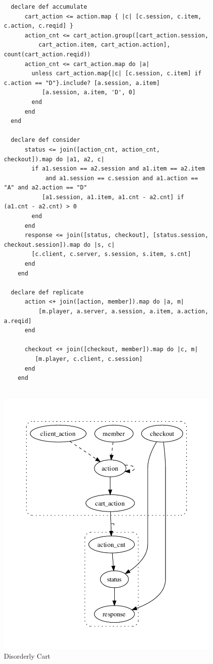 \begin{figure}[t]
\begin{tiny}
\begin{verbatim}
  declare def accumulate 
      cart_action <= action.map { |c| [c.session, c.item, c.action, c.reqid] }
      action_cnt <= cart_action.group([cart_action.session, 
          cart_action.item, cart_action.action], count(cart_action.reqid))
      action_cnt <= cart_action.map do |a| 
        unless cart_action.map{|c| [c.session, c.item] if c.action == "D"}.include? [a.session, a.item] 
           [a.session, a.item, 'D', 0]
        end 
      end
  end

  declare def consider
      status <= join([action_cnt, action_cnt, checkout]).map do |a1, a2, c| 
        if a1.session == a2.session and a1.item == a2.item 
            and a1.session == c.session and a1.action == "A" and a2.action == "D"
           [a1.session, a1.item, a1.cnt - a2.cnt] if (a1.cnt - a2.cnt) > 0
        end
      end
      response <= join([status, checkout], [status.session, checkout.session]).map do |s, c| 
        [c.client, c.server, s.session, s.item, s.cnt]
      end
    end

  declare def replicate
      action <+ join([action, member]).map do |a, m|
          [m.player, a.server, a.session, a.item, a.action, a.reqid]
      end

      checkout <+ join([checkout, member]).map do |c, m|
         [m.player, c.client, c.session]
      end
    end


\end{verbatim}
\end{tiny}

\centering
\includegraphics[width=0.7\linewidth]{fig/BasicCartServer_gvoutput.pdf}
\caption{Disorderly Cart}
\label{fig:pdg-disorderly}
\end{figure}


